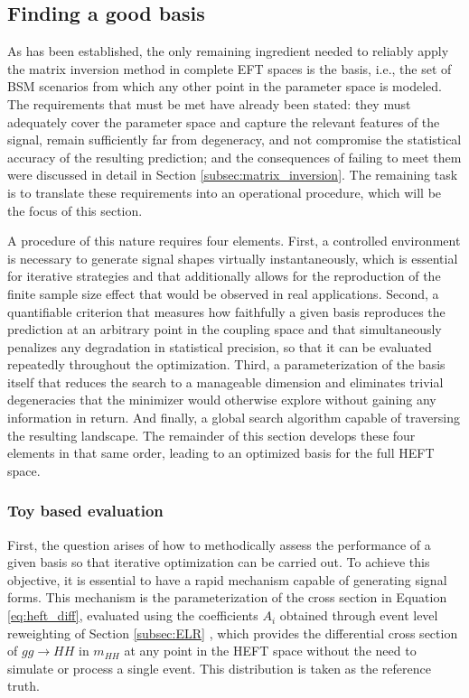 \subsection{Finding a good basis}
\label{subsec:finding_basis}
As has been established, the only remaining ingredient needed to reliably apply the matrix inversion method in complete EFT spaces is the basis, i.e., the set of BSM scenarios from which any other point in the parameter space is modeled. The requirements that must be met have already been stated: they must adequately cover the parameter space and capture the relevant features of the signal, remain sufficiently far from degeneracy, and not compromise the statistical accuracy of the resulting prediction; and the consequences of failing to meet them were discussed in detail in Section \ref{subsec:matrix_inversion}. The remaining task is to translate these requirements into an operational procedure, which will be the focus of this section.

A procedure of this nature requires four elements. First, a controlled environment is necessary to generate signal shapes virtually instantaneously, which is essential for iterative strategies and that additionally allows for the reproduction of the finite sample size effect that would be observed in real applications. Second, a quantifiable criterion that measures how faithfully a given basis reproduces the prediction at an arbitrary point in the coupling space and that simultaneously penalizes any degradation in statistical precision, so that it can be evaluated repeatedly throughout the optimization. Third, a parameterization of the basis itself that reduces the search to a manageable dimension and eliminates trivial degeneracies that the minimizer would otherwise explore without gaining any information in return. And finally, a global search algorithm capable of traversing the resulting landscape. The remainder of this section develops these four elements in that same order, leading to an optimized basis for the full HEFT space.\\

\subsubsection{Toy based evaluation}
\label{subsec:toy_evaluation}
First, the question arises of how to methodically assess the performance of a given basis so that iterative optimization can be carried out. To achieve this objective, it is essential to have a rapid mechanism capable of generating signal forms. This mechanism is the parameterization of the cross section in Equation \ref{eq:heft_diff}, evaluated using the coefficients $A_i$ obtained through event level reweighting of Section \ref{subsec:ELR} \cite{HHReweighting}, which provides the differential cross section of $gg\to HH$ in $m_{HH}$ at any point in the HEFT space without the need to simulate or process a single event. This distribution is taken as the reference truth.

